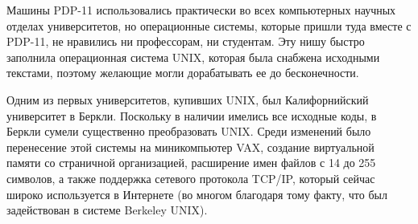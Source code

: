 \documentclass[10pt]{article}
\begin{document}
	Машины PDP-11 использовались практически во всех компьютерных научных отделах университетов, но операционные системы, которые  пришли туда вместе с PDP-11, не нравились ни профессорам, ни студентам. Эту нишу быстро заполнила операционная система UNIX, которая была снабжена исходными текстами, поэтому желающие могли дорабатывать ее до бесконечности.

	Одним из первых университетов, купивших UNIX, был Калифорнийский университет в Беркли. Поскольку в наличии имелись все исходные коды, в Беркли сумели существенно преобразовать UNIX. Среди изменений было перенесение этой системы на миникомпьютер VAX, создание виртуальной памяти со страничной организацией, расширение имен файлов с 14 до 255 символов, а также поддержка сетевого протокола TCP/IP, который сейчас широко используется в  Интернете (во многом благодаря тому факту, что был задействован в системе Berkeley UNIX).
\end{document}
